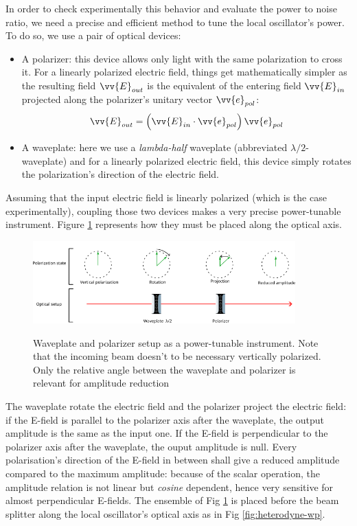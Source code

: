 \documentclass[10pt]{report}
\begin{document}
In order to check experimentally this behavior and evaluate the power to noise ratio, we need a precise and efficient method to tune the local oscillator's power. To do so, we use a pair of optical devices:
\begin{itemize}
	\item A polarizer: this device allows only light with the same polarization to cross it. For a linearly polarized electric field, things get mathematically simpler as the resulting field $\vv{E}_{out}$ is the equivalent of the entering field $\vv{E}_{in}$ projected along the polarizer's unitary vector $\vv{e}_{pol}$:
	\begin{equation}
	\vv{E}_{out} = \left( \vv{E}_{in} \cdot \vv{e}_{pol} \right) \vv{e}_{pol}
	\end{equation}
	\item A waveplate: here we use a \textit{lambda-half} waveplate (abbreviated $\lambda/2$-waveplate) and for a linearly polarized electric field, this device simply rotates the polarization's direction of the electric field.  
\end{itemize}

Assuming that the input electric field is linearly polarized (which is the case experimentally), coupling those two devices makes a very precise power-tunable instrument. Figure \ref{fig:wp-pol-setup} represents how they must be placed along the optical axis.

\begin{figure}[h!]
\caption{Waveplate and polarizer setup as a power-tunable instrument. Note that the incoming beam doesn't to be necessary vertically polarized. Only the relative angle between the waveplate and polarizer is relevant for amplitude reduction}
\centering
\includegraphics[width=0.9\textwidth]{wp-pol-setup}
\label{fig:wp-pol-setup}
\end{figure}

The waveplate rotate the electric field and the polarizer project the electric field: if the E-field is parallel to the polarizer axis after the waveplate, the output amplitude is the same as the input one. If the E-field is perpendicular to the polarizer axis after the waveplate, the ouput amplitude is null. Every polarisation's direction of the E-field in between shall give a reduced amplitude compared to the maximum amplitude: because of the scalar operation, the amplitude relation is not linear but \textit{cosine} dependent, hence very sensitive for almost perpendicular E-fields. The ensemble of Fig \ref{fig:wp-pol-setup} is placed before the beam splitter along the local oscillator's optical axis as in Fig \ref{fig:heterodyne-wp}.
\end{document}
